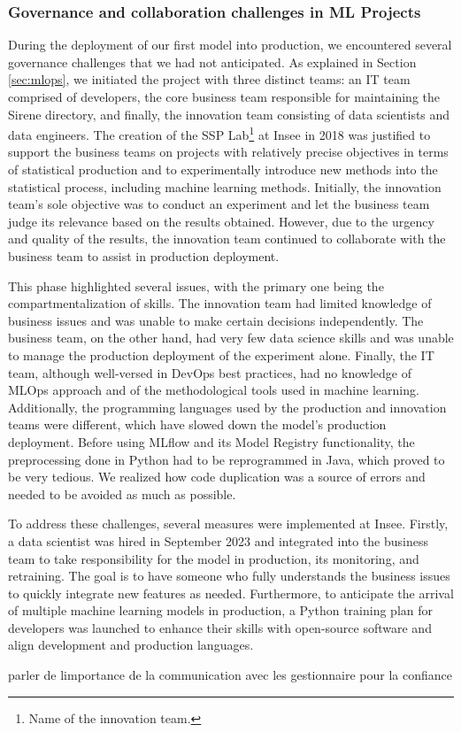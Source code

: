 \subsubsection{Governance and collaboration challenges in ML Projects}

During the deployment of our first model into production, we encountered several governance challenges that we had not anticipated. As explained in Section \ref{sec:mlops}, we initiated the project with three distinct teams: an IT team comprised of developers, the core business team responsible for maintaining the Sirene directory, and finally, the innovation team consisting of data scientists and data engineers. The creation of the SSP Lab\footnote{Name of the innovation team.} at Insee in 2018 was justified to support the business teams on projects with relatively precise objectives in terms of statistical production and to experimentally introduce new methods into the statistical process, including machine learning methods. Initially, the innovation team's sole objective was to conduct an experiment and let the business team judge its relevance based on the results obtained. However, due to the urgency and quality of the results, the innovation team continued to collaborate with the business team to assist in production deployment.

This phase highlighted several issues, with the primary one being the compartmentalization of skills. The innovation team had limited knowledge of business issues and was unable to make certain decisions independently. The business team, on the other hand, had very few data science skills and was unable to manage the production deployment of the experiment alone. Finally, the IT team, although well-versed in DevOps best practices, had no knowledge of MLOps approach and of the methodological tools used in machine learning. Additionally, the programming languages used by the production and innovation teams were different, which have slowed down the model's production deployment. Before using MLflow and its Model Registry functionality, the preprocessing done in Python had to be reprogrammed in Java, which proved to be very tedious. We realized how code duplication was a source of errors and needed to be avoided as much as possible.

To address these challenges, several measures were implemented at Insee. Firstly, a data scientist was hired in September 2023 and integrated into the business team to take responsibility for the model in production, its monitoring, and retraining. The goal is to have someone who fully understands the business issues to quickly integrate new features as needed. Furthermore, to anticipate the arrival of multiple machine learning models in production, a Python training plan for developers was launched to enhance their skills with open-source software and align development and production languages.


parler de limportance de la communication avec les gestionnaire pour la confiance
